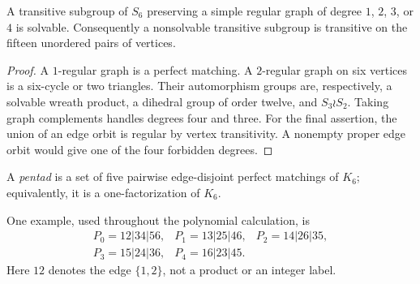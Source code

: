 \documentclass[11pt,letterpaper]{article}
\numberwithin{equation}{section}
\theoremstyle{definition}
\theoremstyle{remark}
\begin{document}
\begin{lemma}
\label{zpt:lem:graphs}
A transitive subgroup of $S_6$ preserving a simple regular graph of degree
$1$, $2$, $3$, or $4$ is solvable. Consequently a nonsolvable transitive
subgroup is transitive on the fifteen unordered pairs of vertices.
\end{lemma}
\begin{proof}
A $1$-regular graph is a perfect matching. A $2$-regular graph on six
vertices is a six-cycle or two triangles. Their automorphism groups are,
respectively, a solvable wreath product, a dihedral group of order twelve,
and $S_3\wr S_2$. Taking graph complements handles degrees four and three.
For the final assertion, the union of an edge orbit is regular by vertex
transitivity. A nonempty proper edge orbit would give one of the four
forbidden degrees.
\end{proof}

\begin{definition}
A \emph{pentad} is a set of five pairwise edge-disjoint perfect matchings of
$K_6$; equivalently, it is a one-factorization of $K_6$.
\end{definition}

One example, used throughout the polynomial calculation, is
\begin{equation}
\begin{array}{lll}
 P_0=12|34|56,&P_1=13|25|46,&P_2=14|26|35,\\
 P_3=15|24|36,&P_4=16|23|45.&
\end{array}\label{zpt:eq:pentad}
\end{equation}
Here $12$ denotes the edge $\{1,2\}$, not a product or an integer label.
\end{document}
